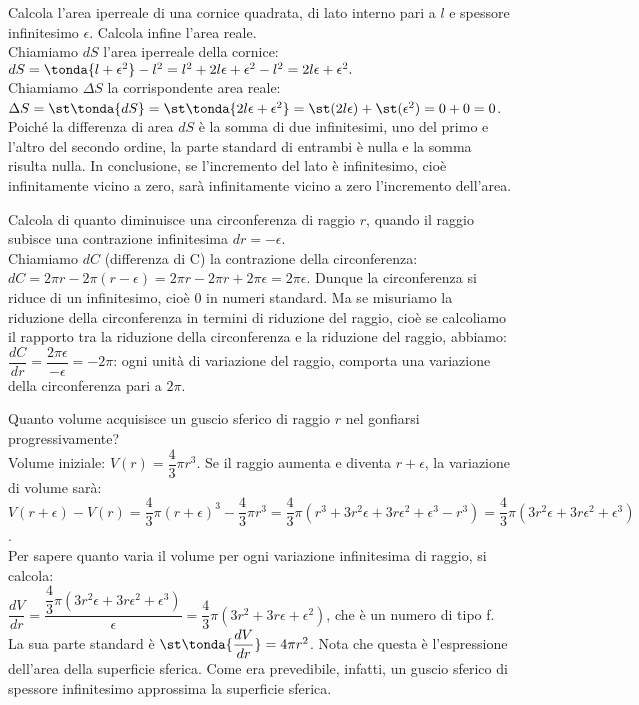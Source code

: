 \begin{esempio}
Calcola l'area iperreale di una cornice quadrata, di lato interno pari a 
\(l\) e
spessore infinitesimo \(\epsilon\). Calcola infine l'area reale.\\
Chiamiamo \(dS\) l'area iperreale della cornice:
\(dS=\tonda{l+\epsilon^2}
-l^2=l^2+2l\epsilon+\epsilon^2-l^2=2l\epsilon+\epsilon^2.\)\\
Chiamiamo \(\Delta S\) la corrispondente area reale:
\(\Delta S=\st\tonda{dS}=\st\tonda{2l\epsilon+\epsilon^2}=
\st(2l\epsilon)+\st(\epsilon^2)=0+0=0\).\\
Poiché la differenza di area \(dS\) è la somma di due infinitesimi, uno del 
primo e l'altro del secondo ordine, la parte standard di entrambi è nulla e 
la somma risulta nulla. 
In conclusione, se l'incremento del lato è infinitesimo,
cioè infinitamente vicino a zero, sarà infinitamente vicino a zero 
l'incremento dell'area.
\end{esempio}

\begin{esempio}
Calcola di quanto diminuisce una circonferenza di raggio \(r\),
quando il raggio subisce una contrazione infinitesima \(dr=-\epsilon\).\\
Chiamiamo \(dC\) (differenza di C) la contrazione della circonferenza:
\(dC=2\pi r-2\pi (r-\epsilon)=2\pi r-2\pi r+2\pi \epsilon= 2\pi \epsilon\).
Dunque la circonferenza si riduce di un infinitesimo, cioè \(0\) in numeri 
standard.
Ma se misuriamo la riduzione della circonferenza in termini
di riduzione del raggio, cioè se calcoliamo il rapporto tra la riduzione 
della circonferenza e la riduzione del raggio, abbiamo:
\(\dfrac{dC}{dr}=\dfrac{2\pi \epsilon}{-\epsilon}=-2\pi\): ogni unità di 
variazione del raggio, comporta una variazione della circonferenza pari a 
\(2\pi\).
\end{esempio}

\begin{esempio}
Quanto volume acquisisce un guscio sferico di raggio \(r\) nel gonfiarsi
progressivamente?\\
Volume iniziale: \(V(r)=\dfrac{4}{3}\pi r^3\). Se il raggio aumenta e diventa 
\(r+\epsilon\), 
la variazione di volume sarà:\\
\(V(r+\epsilon)-V(r)=\dfrac{4}{3}\pi (r+\epsilon)^3-\dfrac{4}{3}\pi r^3=
\dfrac{4}{3}\pi (r^3+3r^2\epsilon+3r\epsilon^2+\epsilon^3-r^3)=
\dfrac{4}{3}\pi (3r^2\epsilon+3r\epsilon^2+\epsilon^3)\).\\
Per sapere quanto varia il volume per ogni variazione infinitesima di 
raggio, si calcola:\\
\(\dfrac{dV}{dr}=\dfrac{\dfrac{4}{3}\pi 
(3r^2\epsilon+3r\epsilon^2+\epsilon^3)}{\epsilon}=
\dfrac{4}{3}\pi (3r^2+3r\epsilon+\epsilon^2)\), che è un numero di tipo f.
La sua parte standard è \(\st\tonda{\dfrac{dV}{dr}}=4\pi r^2\). Nota che questa
è l'espressione dell'area della superficie sferica. Come era prevedibile, 
infatti, 
un guscio sferico di spessore infinitesimo approssima la superficie sferica.
\end{esempio}

